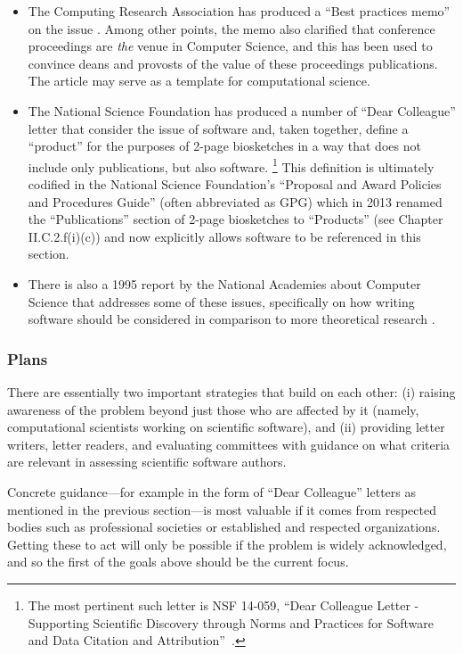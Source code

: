 \begin{itemize}
\item The Computing Research Association has produced a ``Best
  practices memo'' on the issue \cite{PSU99}. Among other points,
  the memo also clarified that conference proceedings are
  \textit{the} venue in Computer Science, and this has been used to
  convince deans and provosts of the value of these proceedings
  publications. The article may serve as a template for computational
  science.
\item The National Science Foundation has produced a number of ``Dear
  Colleague'' letter that consider the issue of software and, taken
  together, define a ``product'' for the purposes of
  2-page biosketches in a way that does not include only publications, but also
  software.%
  \footnote{The most pertinent such letter is NSF
      14-059, ``Dear Colleague Letter - Supporting Scientific
      Discovery through Norms and Practices for Software and Data
      Citation and Attribution''~\cite{nsf-dcl-citation}.}
  This definition is ultimately codified in the National Science
  Foundation's ``Proposal and Award Policies and Procedures Guide''
  (often abbreviated as GPG) which in 2013 renamed the
  ``Publications'' section of 2-page biosketches to ``Products'' (see
  Chapter II.C.2.f(i)(c)) and now explicitly allows software to be
  referenced in this section.
\item There is also a 1995 report by the National Academies about
  Computer Science that addresses some of these issues, specifically
  on how writing software should be considered in comparison to more
  theoretical research \cite{NRC-careers-94}. 
\end{itemize}



\subsubsection{Plans}

There are essentially two important strategies that build on each
other: (i) raising awareness of the problem beyond just those who are
affected by it (namely, computational scientists working on scientific
software), and (ii) providing letter writers, letter readers, and
evaluating committees with guidance on what criteria are relevant in
assessing scientific software authors.

Concrete guidance---for example in the form of ``Dear Colleague''
letters as mentioned in the previous section---is most valuable if it
comes from respected bodies such as professional societies or
established and respected organizations. Getting these to act
will only be possible if the problem is widely acknowledged, and so
the first of the goals above should be the current focus.

